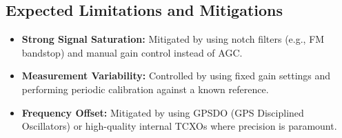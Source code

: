 \documentclass[11pt]{report}
\begin{document}
\subsection*{Expected Limitations and Mitigations}
\begin{itemize}[leftmargin=*]
\item \textbf{Strong Signal Saturation:} Mitigated by using notch filters (e.g., FM bandstop) and manual gain control instead of AGC.
\item \textbf{Measurement Variability:} Controlled by using fixed gain settings and performing periodic calibration against a known reference.
\item \textbf{Frequency Offset:} Mitigated by using GPSDO (GPS Disciplined Oscillators) or high-quality internal TCXOs where precision is paramount.
\end{itemize}
\end{document}
